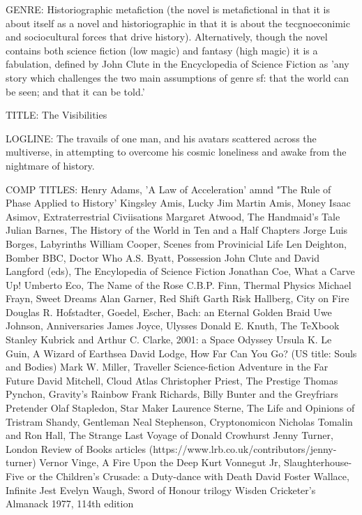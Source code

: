 GENRE:
Historiographic metafiction (the novel is metafictional in that it is about itself as a novel and historiographic in that it is about the tecgnoeconimic and sociocultural forces that drive history). Alternatively, though the novel contains both science fiction (low magic) and fantasy (high magic) it is a fabulation, defined by John Clute in the Encyclopedia of Science Fiction as 'any story which challenges the two main assumptions of genre sf: that the world can be seen; and that it can be told.'

TITLE:
The Visibilities

LOGLINE:
The travails of one man, and his avatars scattered across the multiverse, in attempting to overcome his cosmic loneliness and awake from the nightmare of history. 

COMP TITLES:
Henry Adams, 'A Law of Acceleration' amnd "The Rule of Phase Applied to History'
Kingsley Amis, Lucky Jim
Martin Amis, Money
Isaac Asimov, Extraterrestrial Civiisations
Margaret Atwood, The Handmaid's Tale
Julian Barnes, The History of the World in Ten and a Half Chapters
Jorge Luis Borges, Labyrinths
William Cooper, Scenes from Provinicial Life
Len Deighton, Bomber
BBC, Doctor Who
A.S. Byatt, Possession
John Clute and David Langford (eds), The Encylopedia of Science Fiction
Jonathan Coe, What a Carve Up!
Umberto Eco, The Name of the Rose
C.B.P. Finn, Thermal Physics
Michael Frayn, Sweet Dreams
Alan Garner, Red Shift
Garth Risk Hallberg, City on Fire
Douglas R. Hofstadter, Goedel, Escher, Bach: an Eternal Golden Braid
Uwe Johnson, Anniversaries
James Joyce, Ulysses
Donald E. Knuth, The TeXbook
Stanley Kubrick and Arthur C. Clarke, 2001: a Space Odyssey
Ursula K. Le Guin, A Wizard of Earthsea
David Lodge, How Far Can You Go? (US title: Souls and Bodies)
Mark W. Miller, Traveller Science-fiction Adventure in the Far Future
David Mitchell, Cloud Atlas
Christopher Priest, The Prestige
Thomas Pynchon, Gravity's Rainbow
Frank Richards, Billy Bunter and the Greyfriars Pretender
Olaf Stapledon, Star Maker
Laurence Sterne, The Life and Opinions of Tristram Shandy, Gentleman
Neal Stephenson, Cryptonomicon
Nicholas Tomalin and Ron Hall, The Strange Last Voyage of Donald Crowhurst
Jenny Turner, London Review of Books articles (https://www.lrb.co.uk/contributors/jenny-turner)
Vernor Vinge, A Fire Upon the Deep
Kurt Vonnegut Jr, Slaughterhouse-Five or the Children's Crusade: a Duty-dance with Death
David Foster Wallace, Infinite Jest
Evelyn Waugh, Sword of Honour trilogy
Wisden Cricketer's Almanack 1977, 114th edition

